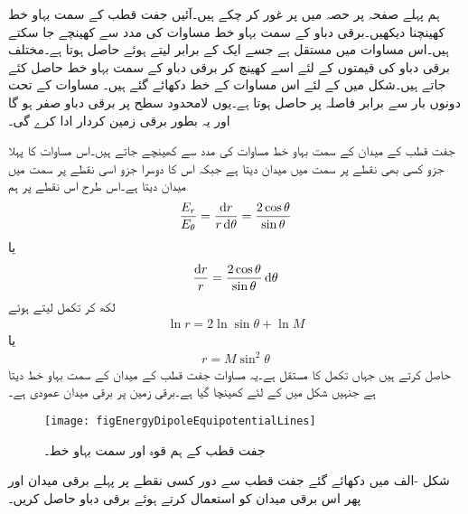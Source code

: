 ہم پہلے صفحہ  پر حصہ  میں  پر غور کر  چکے ہیں۔آئیں جفت قطب کے سمت بہاو خط کھینچنا دیکھیں۔برقی دباو کے سمت بہاو خط مساوات  کی مدد سے کھینچے جا سکتے ہیں۔اس مساوات میں  مستقل ہے جسے ایک کے برابر لیتے ہوئے   حاصل ہوتا ہے۔مختلف برقی دباو کی قیمتوں کے لئے اسے کھینچ کر برقی دباو کے سمت بہاو خط حاصل کئے جاتے ہیں۔شکل  میں  کے لئے اس مساوات کے خط دکھائے گئے ہیں۔ مساوات  کے تحت دونوں بار سے برابر فاصلہ پر  حاصل ہوتا ہے۔یوں  لامحدود سطح پر برقی دباو صفر ہو گا اور یہ بطور برقی زمین کردار ادا کرے گی۔ 

جفت قطب کے میدان کے سمت بہاو خط مساوات  کی مدد سے کھینچے جاتے ہیں۔اس مساوات کا پہلا جزو کسی بھی نقطے پر  سمت میں میدان  دیتا ہے جبکہ اس کا دوسرا جزو اسی نقطے پر  سمت میں میدان  دیتا ہے۔اس طرح اس نقطے پر ہم
\begin{align*}
\frac{E_r}{E_\theta}=\frac{\dif r}{r \dif \theta} =\frac{2 \cos \theta}{\sin \theta}
\end{align*}
یا
\begin{align*}
\frac{\dif r}{r } =\frac{2 \cos \theta}{\sin \theta}\dif \theta
\end{align*}
لکھ کر تکمل لیتے ہوئے
\begin{align*}
\ln r =2 \ln \sin \theta +\ln M
\end{align*}
یا
\begin{align}
r=M \sin^2 \theta
\end{align}
حاصل کرتے ہیں جہاں  تکمل کا مستقل ہے۔یہ مساوات جفت قطب کے میدان کے سمت بہاو خط دیتا ہے جنہیں شکل  میں  کے لئے کھینچا گیا ہے۔برقی زمین پر برقی میدان عمودی ہے۔
\begin{figure}
\centering
\texttt{[image: figEnergyDipoleEquipotentialLines]}
\caption{جفت قطب کے ہم قوہ اور سمت بہاو خط۔}
\label{شکل_توانائی_جفت_قطب_ہم_قوہ_اور_سمت_بہاو_خط}
\end{figure}

شکل -الف میں دکھائے گئے جفت قطب سے دور کسی نقطے  پر پہلے برقی میدان اور پھر اس برقی میدان کو استعمال کرتے ہوئے برقی دباو حاصل کریں۔

